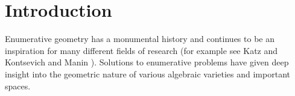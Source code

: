 \documentclass[12pt]{article}
\theoremstyle{plain}
\theoremstyle{definition}
\newcommand{\A}{\mathcal{A}}
\newcommand{\M}{\mathcal{M}}
\newcommand{\MLA}{\M_{\A}}
\renewcommand{\P}{\ensuremath \mathbb{P}}
\begin{document}

\section{Introduction}

Enumerative geometry has a monumental history and continues to be an inspiration for many different fields of research (for example see Katz \cite{Katz} and Kontsevich and Manin \cite{KM-94}). Solutions to enumerative problems have given deep insight into the geometric nature of various algebraic varieties and important spaces. 
\end{document}
